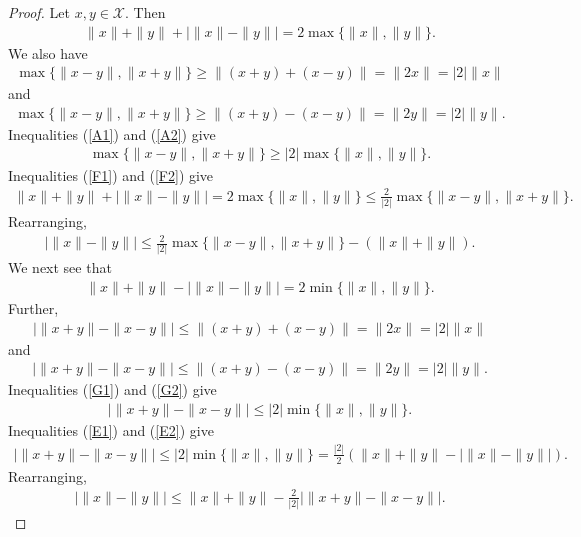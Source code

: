 \documentclass[10pt,a4paper]{amsart}
\begin{document}
\begin{proof}
	Let $x, y \in \mathcal{X}$. Then 
	\begin{align}\label{F1}
		\|x\|+\|y\|+\bigg|\|x\|-\|y\|\bigg|=2\max\{\|x\|, \|y\|\}.
	\end{align}	
We also have 
\begin{align}\label{A1}
	\max\{\|x-y\|, \|x+y\|\}\geq \|(x+y)+(x-y)\|=\|2x\|=|2|\|x\|
\end{align}
and 
\begin{align}\label{A2}
	\max\{\|x-y\|, \|x+y\|\}\geq \|(x+y)-(x-y)\|=\|2y\|=|2|\|y\|.
\end{align}
Inequalities (\ref{A1}) and (\ref{A2}) give 
\begin{align}\label{F2}
		\max\{\|x-y\|, \|x+y\|\}\geq |2|\max\{\|x\|, \|y\|\}.
\end{align}
Inequalities (\ref{F1}) and (\ref{F2}) give 
\begin{align*}
	\|x\|+\|y\|+\bigg|\|x\|-\|y\|\bigg|=2\max\{\|x\|, \|y\|\}\leq \frac{2}{|2|}\max\{\|x-y\|, \|x+y\|\}.
\end{align*}
Rearranging, 
\begin{align*}
\bigg|\|x\|-\|y\|\bigg|\leq \frac{2}{|2|}\max\{\|x-y\|, \|x+y\|\}-(\|x\|+\|y\|).
\end{align*}
We next see that 
	\begin{align}\label{E1}
	\|x\|+\|y\|-\bigg|\|x\|-\|y\|\bigg|=2\min\{\|x\|, \|y\|\}.
\end{align}	
Further, 
\begin{align}\label{G1}
	\bigg|\|x+y\|-\|x-y\|\bigg|\leq	\|(x+y)+(x-y)\|=\|2x\|=|2|\|x\|
\end{align}
and 
\begin{align}\label{G2}
	\bigg|\|x+y\|-\|x-y\|\bigg|\leq	\|(x+y)-(x-y)\|=\|2y\|=|2|\|y\|.
\end{align}
Inequalities (\ref{G1}) and (\ref{G2}) give 
\begin{align}\label{E2}
	\bigg|\|x+y\|-\|x-y\|\bigg|\leq	|2|\min\{\|x\|, \|y\|\}.
\end{align}
Inequalities (\ref{E1}) and (\ref{E2}) give 
\begin{align*}
		\bigg|\|x+y\|-\|x-y\|\bigg|\leq	|2|\min\{\|x\|, \|y\|\}= \frac{|2|}{2}\left(\|x\|+\|y\|-\bigg|\|x\|-\|y\|\bigg|\right).
\end{align*}
Rearranging, 
\begin{align*}
\bigg|\|x\|-\|y\|\bigg|\leq \|x\|+\|y\|-\frac{2}{|2|}\bigg|\|x+y\|-\|x-y\|\bigg|.
\end{align*}
\end{proof}
\end{document}
